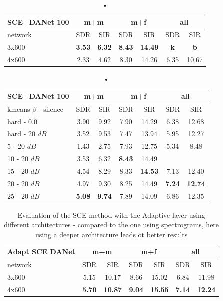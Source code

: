 \documentclass[master, tikz, final,11pt, dvipdfmx]{iscs-thesis}
\begin{document}
\begin{table}[h!]
\centering
\begin{tabular}{l|c|c|c|c|c|c}
SCE+DANet 100 & \multicolumn{2}{c|}{m+m} & \multicolumn{2}{c|}{m+f} & \multicolumn{2}{c}{all} \\ 
\hline 
network & SDR & SIR & SDR & SIR & SDR & SIR \\ 
\hline 
3x600 & \textbf{3.53} & \textbf{6.32} & \textbf{8.43} & \textbf{14.49} & \textbf{k} & \textbf{b} \\ 
4x600 & 2.33 & 4.62 & 8.30 & 14.26 & 6.35 & 10.67 \\  
\end{tabular}
\captionsetup{justification=centering}
\caption{•}
\label{table:SCE100DANETarch}
\end{table}


\begin{table}[h!]
\centering
\begin{tabular}{l|c|c|c|c|c|c}
SCE+DANet 100 & \multicolumn{2}{c|}{m+m} & \multicolumn{2}{c|}{m+f} & \multicolumn{2}{c}{all} \\ 
\hline 
kmeans $\beta$ - silence & SDR & SIR & SDR & SIR & SDR & SIR \\ 
\hline
hard - 0.0  & 3.90 & 9.92 & 7.90 & 14.29 & 6.38 & 12.68 \\ 
hard - 20 $dB$  & 3.52 & 9.53 & 7.47 & 13.94 & 5.95 & 12.27 \\
\hline
\hline
5 - 20 $dB$  & 1.43 & 2.75 & 7.93 & 12.75 & 5.34 & 8.48 \\ 
10 - 20 $dB$  & 3.53 & 6.32 & \textbf{8.43} & 14.49 &  &  \\ 
15 - 20 $dB$ & 4.54 & 8.29 & 8.33 & \textbf{14.53} & 7.13 & 12.40 \\ 
20 - 20 $dB$ & 4.97 & 9.30 & 8.25 & 14.49 & \textbf{7.24} & \textbf{12.74} \\ 
25 - 20 $dB$ & \textbf{5.08} & \textbf{9.74} & 7.89 & 14.09 & 6.86 & 12.35 \\ 
\end{tabular}
\captionsetup{justification=centering}
\caption{•}
\label{table:SCE100DANET}
\end{table}

\begin{table}[h!]
\centering
\begin{tabular}{l|c|c|c|c|c|c}
Adapt SCE DANet & \multicolumn{2}{c|}{m+m} & \multicolumn{2}{c|}{m+f} & \multicolumn{2}{c}{all} \\ 
\hline 
network & SDR & SIR & SDR & SIR & SDR & SIR \\ 
\hline 
3x600 & 5.15 & 10.17 & 8.66 & 15.02 & 6.84 & 11.98 \\ 
4x600 & \textbf{5.70} & \textbf{10.87} & \textbf{9.04} & \textbf{15.55} & \textbf{7.14} & \textbf{12.24} \\  
\end{tabular}
\caption{Evaluation of the SCE method with the Adaptive layer using different architectures - compared to the one using spectrograms, here using a deeper architecture leads ot better results}
\label{table:AdaptSCEDANETarch}
\end{table}
\end{document}
